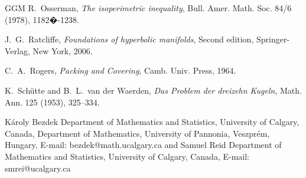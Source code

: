 \documentclass[10pt]{article}
\numberwithin{Subcase}{Case}
\begin{document}
\begin{thebibliography}{GGM}
R.~Osserman, {\em The isoperimetric inequality}, Bull. Amer. Math. Soc. 84/6 (1978), 1182�-1238.


J.~G.~Ratcliffe, {\em Foundations of hyperbolic manifolds}, Second edition, Springer-Verlag, New York, 2006. 


C.~A.~Rogers, {\em Packing and Covering}, Camb. Univ. Press, 1964.




K.~Sch\"utte and B.~L.~van der Waerden, {\em Das Problem der dreizehn Kugeln}, Math. Ann. 125 (1953), 325--334.
 

\end{thebibliography}


\vspace{1cm}

\medskip




\noindent
K\'aroly Bezdek
\newline
Department of Mathematics and Statistics, University of Calgary, Canada,
\newline
Department of Mathematics, University of Pannonia, Veszpr\'em, Hungary,
\newline
{\sf E-mail: bezdek@math.ucalgary.ca}
\newline
and
\newline
Samuel Reid
\newline
Department of Mathematics and Statistics, University of Calgary, Canada,
\newline
{\sf E-mail: smrei@ucalgary.ca} 
\end{document}
